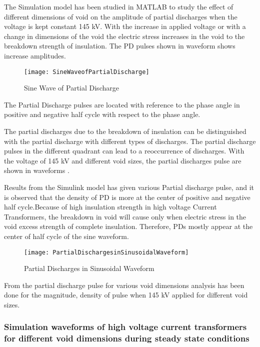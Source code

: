 The Simulation model has been studied in MATLAB to study the effect of different dimensions of void on the amplitude of partial discharges when the voltage is kept constant 145 kV. With the increase in applied voltage or with a change in dimensions of the void the electric stress increases in the void to the breakdown strength of insulation. The PD pulses shown in waveform shows increase amplitudes.

\begin{figure}[h!]
    \centering
    \texttt{[image: SineWaveofPartialDischarge]}
    \caption{Sine Wave of Partial Discharge }
    \label{fig:Sine Wave of Partial Discharge }
\end{figure}
 
The Partial Discharge pulses are located with reference to the phase angle in positive and negative half cycle with respect to the phase angle.

The partial discharges due to the breakdown of insulation can be distinguished with the partial discharge with different types of discharges. The partial discharge pulses in the different quadrant can lead to a reoccurrence of discharges. With the voltage of 145 kV and different void sizes, the partial discharges pulse are shown in waveforms \cite{Dielectricwithstands}.

Results from the Simulink model has given various Partial discharge pulse, and it is observed that the density of PD is more at the center of positive and negative half cycle.Because of high insulation strength in high voltage Current Transformers, the breakdown in void will cause only when electric stress in the void excess strength of complete insulation. Therefore, PDs mostly appear at the center of half cycle of the sine waveform. 

\begin{figure}[h!]
    \centering
    \texttt{[image: PartialDischargesinSinusoidalWaveform]}
    \caption{Partial Discharges in Sinusoidal Waveform}
    \label{fig:Partial Discharges in Sinusoidal Waveform}
\end{figure}

From the partial discharge pulse for various void dimensions analysis has been done for the magnitude, density of pulse when 145 kV applied for different void sizes\setlength{\parskip}{0em}.

\clearpage
\subsubsection{Simulation waveforms of high voltage current transformers for different void dimensions during steady state conditions}

